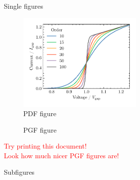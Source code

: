 \documentclass[11pt]{amsart}
\begin{document}
{\huge Single figures}

\begin{figure}[h!]
\centering 
\includegraphics[width=0.55\textwidth]{../figures/fig1.pdf}
\caption{PDF figure}
\end{figure}

\begin{figure}[h!]
\centering 

\caption{PGF figure}
\end{figure}

\begin{center}
\textcolor{red}{\huge Try printing this document!}\\
\textcolor{red}{\huge Look how much nicer PGF figures are!}
\end{center}


\newpage
{\huge Subfigures}
\end{document}
